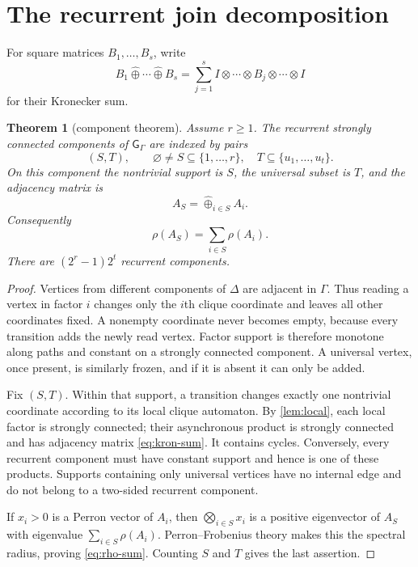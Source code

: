 \documentclass[11pt,a4paper]{amsart}
\newtheorem{theorem}{Theorem}[section]
\theoremstyle{definition}
\theoremstyle{remark}
\newcommand{\bigoplusK}{\mathbin{\widehat\oplus}}
\begin{document}
\section{The recurrent join decomposition}

For square matrices $B_1,\ldots,B_s$, write
\[
 B_1\bigoplusK\cdots\bigoplusK B_s
 =\sum_{j=1}^s I\otimes\cdots\otimes B_j\otimes\cdots\otimes I
\]
for their Kronecker sum.

\begin{theorem}[component theorem]\label{thm:components}
Assume $r\geq1$.  The recurrent strongly connected components of
$\mathsf G_\Gamma$ are indexed by pairs
\[
 (S,T),\qquad \varnothing\neq S\subseteq\{1,\ldots,r\},
 \quad T\subseteq\{u_1,\ldots,u_t\}.
\]
On this component the nontrivial support is $S$, the universal subset is
$T$, and the adjacency matrix is
\begin{equation}\label{eq:kron-sum}
 A_S=\bigoplusK_{i\in S}A_i.
\end{equation}
Consequently
\begin{equation}\label{eq:rho-sum}
 \rho(A_S)=\sum_{i\in S}\rho(A_i).
\end{equation}
There are $(2^r-1)2^t$ recurrent components.
\end{theorem}

\begin{proof}
Vertices from different components of $\Delta$ are adjacent in $\Gamma$.
Thus reading a vertex in factor $i$ changes only the $i$th clique coordinate
and leaves all other coordinates fixed.  A nonempty coordinate never becomes
empty, because every transition adds the newly read vertex.  Factor support
is therefore monotone along paths and constant on a strongly connected
component.  A universal vertex, once present, is similarly frozen, and if it
is absent it can only be added.

Fix $(S,T)$.  Within that support, a transition changes exactly one
nontrivial coordinate according to its local clique automaton.  By
\cref{lem:local}, each local factor is strongly connected; their asynchronous
product is strongly connected and has adjacency matrix
\eqref{eq:kron-sum}.  It contains cycles.  Conversely, every recurrent
component must have constant support and hence is one of these products.
Supports containing only universal vertices have no internal edge and do not
belong to a two-sided recurrent component.

If $x_i>0$ is a Perron vector of $A_i$, then
$\bigotimes_{i\in S}x_i$ is a positive eigenvector of $A_S$ with eigenvalue
$\sum_{i\in S}\rho(A_i)$.  Perron--Frobenius theory makes this the spectral
radius, proving \eqref{eq:rho-sum}.  Counting $S$ and $T$ gives the last
assertion.
\end{proof}
\end{document}
